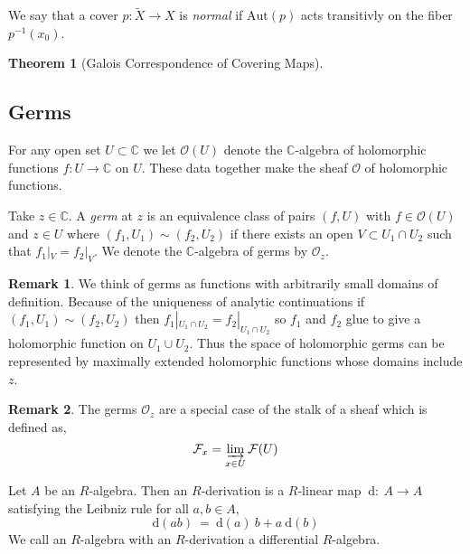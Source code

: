 \documentclass[12pt]{extarticle}
\newcommand{\C}{\mathbb{C}}
\renewcommand{\d}[1]{\: \mathrm{d}#1 \:}
\theoremstyle{definition}
\newtheorem{theorem}{Theorem}[section]
\newtheorem{remark}{Remark}
\newenvironment{definition}[1][Definition:]{\begin{trivlist}
\item[\hskip \labelsep {\bfseries #1}]}{\end{trivlist}}
\newcommand{\F}{\mathcal{F}}
\renewcommand{\O}{\mathcal{O}}
\newcommand{\Aut}[1]{\mathrm{Aut}\left( #1 \right)}
\begin{document}
\begin{definition}
We say that a cover $p : \tilde{X} \to X$ is \textit{normal} if $\Aut{p}$ acts transitivly on the fiber $p^{-1}(x_0)$. 
\end{definition}

\begin{theorem}[Galois Correspondence of Covering Maps]

\end{theorem}

\subsection{Germs}

\begin{definition}
For any open set $U \subset \C$ we let $\O(U)$ denote the $\C$-algebra of holomorphic functions $f : U \to \C$ on $U$. These data together make the sheaf $\O$ of holomorphic functions.
\end{definition}

\begin{definition}
Take $z \in \C$. A \textit{germ} at $z$ is an equivalence class of pairs $(f, U)$ with $f \in \O(U)$ and $z \in U$ where $(f_1, U_1) \sim (f_2, U_2)$ if there exists an open $V \subset U_1 \cap U_2$ such that $f_1 |_V =f_2 |_V$. We denote the $\C$-algebra of germs by $\O_z$. 
\end{definition}

\begin{remark}
We think of germs as functions with arbitrarily small domains of definition. Because of the uniqueness of analytic continuations if $(f_1, U_1) \sim (f_2, U_2)$ then $f_1 |_{U_1 \cap U_2} = f_2 |_{U_1 \cap U_2}$ so $f_1$ and $f_2$ glue to give a holomorphic function on $U_1 \cup U_2$. Thus the space of holomorphic germs can be represented by maximally extended holomorphic functions whose domains include $z$. 
\end{remark}

\begin{remark}
The germs $\O_z$ are a special case of the stalk of a sheaf which is defined as,
\[ \F_x = \varinjlim_{x \in U} \F(U) \]
\end{remark}

\begin{definition}
Let $A$ be an $R$-algebra. Then an $R$-derivation is a $R$-linear map $\d : A \to A$ satisfying the Leibniz rule for all $a, b \in A$,
\[ \d{(ab)} = \d{(a)}b + a \d{(b)} \]
We call an $R$-algebra with an $R$-derivation a differential $R$-algebra.
\end{definition}
\end{document}
